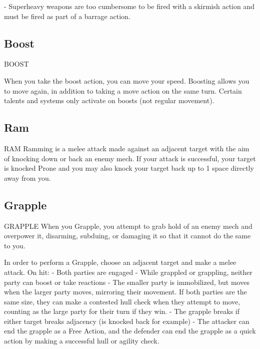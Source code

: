         	- Superheavy weapons are too cumbersome to be fired with a skirmish action and must  
        be fired as part of a barrage action.
 
\subsection{Boost}

                                                BOOST  

When you take the boost action, you can move your speed. Boosting allows you to move again,  
in addition to taking a move action on the same turn. Certain talents and systems only activate  
on boosts (not regular movement).
 
\subsection{Ram}

                                                 RAM  
Ramming is a melee attack made against an adjacent target with the aim of knocking down or  
back an enemy mech.   
If your attack is successful, your target is knocked Prone and you may also knock your target  
back up to 1 space directly away from you.  
\subsection{Grapple}

                                              GRAPPLE  
When you Grapple, you attempt to grab hold of an enemy mech and overpower it, disarming,  
subduing, or damaging it so that it cannot do the same to you.   

In order to perform a Grapple, choose an adjacent target and make a melee attack. On hit:  
    -   Both parties are engaged  
    -   While grappled or grappling, neither party can boost or take reactions  
    -   The smaller party is immobilized, but moves when the larger party moves, mirroring their  
        movement. If both parties are the same size, they can make a contested hull check when  
        they attempt to move, counting as the large party for their turn if they win.  
    -   The grapple breaks if either target breaks adjacency (is knocked back for example)  
    -   The attacker can end the grapple as a Free Action, and the defender can end the grapple  
        as a quick action by making a successful hull or agility check.  

                                                                                                        


